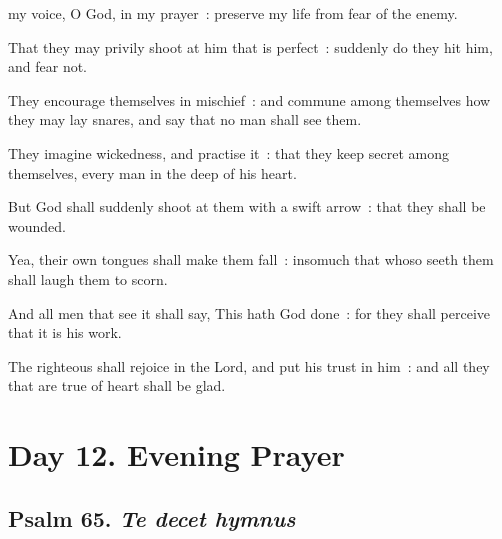  my voice, O God, in my prayer~: preserve my life from fear of the enemy.\par
{}
That they may privily shoot at him that is perfect~: suddenly do they hit him, and fear not.\par
{}They encourage themselves in mischief~: and commune among themselves how they may lay snares, and say that no man shall see them.\par
{}They imagine wickedness, and practise it~: that they keep secret among themselves, every man in the deep of his heart.\par
{}But God shall suddenly shoot at them with a swift arrow~: that they shall be wounded.\par
{}Yea, their own tongues shall make them fall~: insomuch that whoso seeth them shall laugh them to scorn.\par
{}And all men that see it shall say, This hath God done~: for they shall perceive that it is his work.\par
{}The righteous shall rejoice in the Lord, and put his trust in him~: and all they that are true of heart shall be glad.\par

\section*{Day 12. Evening Prayer}

\subsection{Psalm 65. \textit{Te decet hymnus}}

